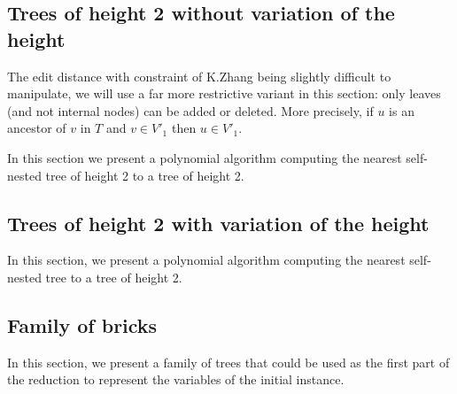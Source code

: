 \subsection{Trees of height 2 without variation of the height}
The edit distance with constraint of K.Zhang being slightly difficult
to manipulate, we will use a far more restrictive variant in this
section: only leaves (and not internal nodes) can be added or
deleted. More precisely, if $u$ is an ancestor of $v$ in $T$ and
$v \in V'_{1}$ then $u \in V'_{1}$.

In this section we present a polynomial algorithm computing the
nearest self-nested tree of height 2 to a tree of height 2.

\subsection{Trees of height 2 with variation of the height}
In this section, we present a polynomial algorithm computing the nearest
self-nested tree to a tree of height 2.

\subsection{Family of bricks}
In this section, we present a family of trees that could be used as
the first part of the reduction to represent the variables of the
initial instance.